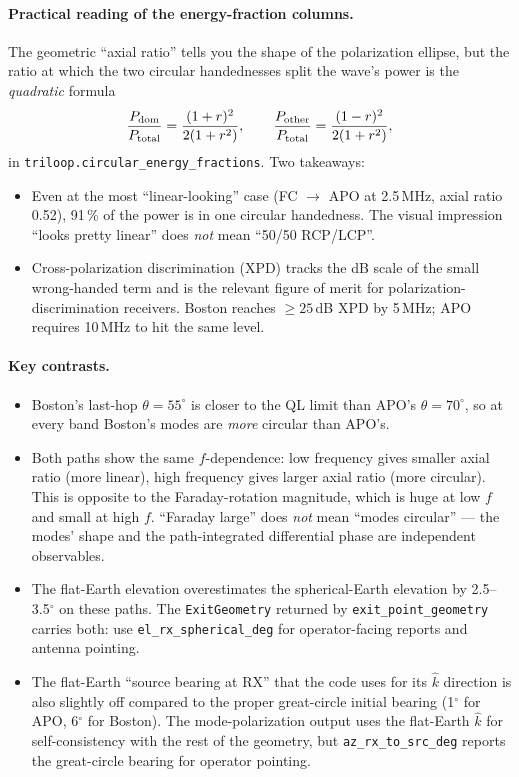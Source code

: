 \documentclass[11pt]{article}
\begin{document}
\paragraph{Practical reading of the energy-fraction columns.}
The geometric ``axial ratio'' tells you the shape of the polarization
ellipse, but the ratio at which the two circular handednesses split
the wave's power is the \emph{quadratic} formula
\[
\frac{P_{\rm dom}}{P_{\rm total}} = \frac{(1+r)^2}{2(1+r^2)},
\qquad
\frac{P_{\rm other}}{P_{\rm total}} = \frac{(1-r)^2}{2(1+r^2)},
\]
in
\texttt{triloop.circular\_energy\_fractions}.  Two takeaways:
\begin{itemize}\itemsep=2pt
\item Even at the most ``linear-looking'' case
      (FC $\to$ APO at 2.5\,MHz, axial ratio 0.52), 91\,\% of the
      power is in one circular handedness.  The visual impression
      ``looks pretty linear'' does \emph{not} mean ``50/50 RCP/LCP''.
\item Cross-polarization discrimination (XPD) tracks the dB scale of
      the small wrong-handed term and is the relevant figure of
      merit for polarization-discrimination receivers.  Boston
      reaches $\geq 25$\,dB XPD by 5\,MHz; APO requires 10\,MHz to
      hit the same level.
\end{itemize}

\paragraph{Key contrasts.}
\begin{itemize}\itemsep=2pt
\item Boston's last-hop $\theta = 55^\circ$ is closer to the QL limit
      than APO's $\theta = 70^\circ$, so at every band Boston's modes
      are \emph{more} circular than APO's.
\item Both paths show the same $f$-dependence: low frequency gives
      smaller axial ratio (more linear), high frequency gives larger
      axial ratio (more circular).  This is opposite to the
      Faraday-rotation magnitude, which is huge at low $f$ and small
      at high $f$.  ``Faraday large'' does \emph{not} mean ``modes
      circular'' --- the modes' shape and the path-integrated
      differential phase are independent observables.
\item The flat-Earth elevation overestimates the spherical-Earth
      elevation by 2.5--3.5$^\circ$ on these paths.  The
      \texttt{ExitGeometry} returned by
      \texttt{exit\_point\_geometry} carries both: use
      \texttt{el\_rx\_spherical\_deg} for operator-facing reports
      and antenna pointing.
\item The flat-Earth ``source bearing at RX'' that the code uses for
      its $\hat k$ direction is also slightly off compared to the
      proper great-circle initial bearing (1$^\circ$ for APO, 6$^\circ$
      for Boston).  The mode-polarization output uses the flat-Earth
      $\hat k$ for self-consistency with the rest of the geometry,
      but \texttt{az\_rx\_to\_src\_deg} reports the great-circle
      bearing for operator pointing.
\end{itemize}
\end{document}

